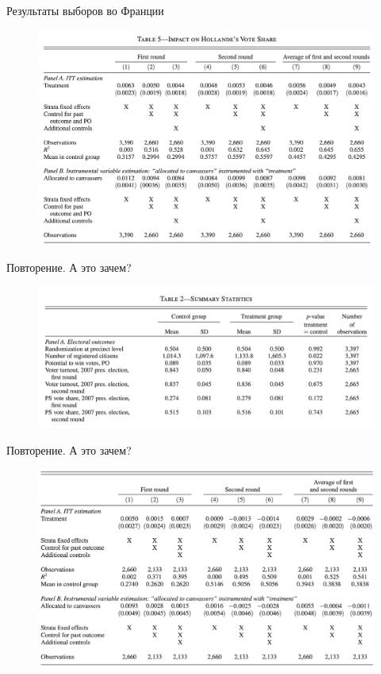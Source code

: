 \begin{frame}{Результаты выборов во Франции}
\begin{figure}
    \centering
    \includegraphics[width=\textwidth]{Images/pons_table.png}
\end{figure}
\end{frame}


\begin{frame}{Повторение. А это зачем?}
\begin{figure}
    \centering
    \includegraphics[width=\textwidth]{Images/balance.png}
\end{figure}
\end{frame}

\begin{frame}{Повторение. А это зачем?}
\begin{figure}
    \centering
    \includegraphics[width=\textwidth]{Images/palcebo.png}
\end{figure}
\end{frame}